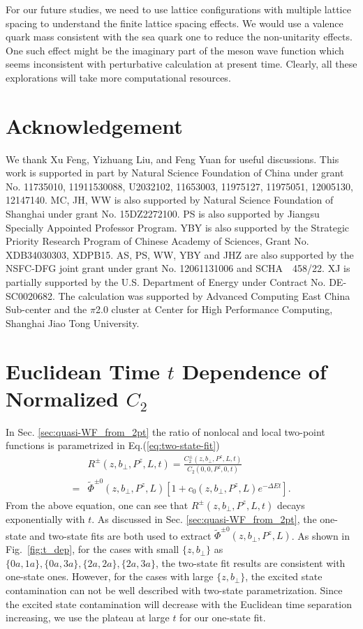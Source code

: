 \documentclass[prd,aps,twocolumn,preprintnumbers, showpacs, nofootinbib,superscriptaddress,notitlepage]{revtex4-1}
\begin{document}
For our future studies, we need to
use lattice configurations with multiple lattice spacing to understand the finite
lattice spacing effects. We would
use a valence quark mass consistent with the sea quark one to reduce the non-unitarity effects. One such effect 
might be the imaginary part of the meson
wave function which seems inconsistent
with perturbative calculation at present time. Clearly, all these explorations will
take more computational resources. 


\section*{Acknowledgement}
We thank Xu Feng, Yizhuang Liu, and Feng Yuan for useful discussions.  This work is supported in part by Natural Science Foundation of China under grant No. 11735010, 11911530088, U2032102, 11653003, 11975127, 11975051, 12005130, 12147140. MC, JH, WW is also supported  by Natural Science Foundation of Shanghai under grant No. 15DZ2272100.  PS is also supported by Jiangsu Specially Appointed Professor Program. YBY is also supported by the Strategic Priority Research Program of Chinese Academy of Sciences, Grant No. XDB34030303, XDPB15. AS, PS, WW, YBY and JHZ are also supported by the NSFC-DFG joint grant under grant No. 12061131006 and SCHA~~458/22. XJ is partially supported by the U.S. Department of Energy under Contract No. DE-SC0020682. The calculation was supported by Advanced Computing East China Sub-center and the $\pi$2.0 cluster at Center for High Performance Computing, Shanghai Jiao Tong University.

\appendix

\section{Euclidean Time $t$ Dependence of Normalized $C_2$}
\label{appsec:C2}


In Sec. \ref{sec:quasi-WF_from_2pt} the ratio of nonlocal and local  two-point functions is parametrized in Eq.(\ref{eq:two-state-fit})
\begin{align}
&R^{\pm}\left(z,b_{\perp},P^z,L,t \right)=\frac{C_2^{\pm}\left(z,b_{\perp},P^z,L,t \right)}{C_2\left(0,0,P^z,0,t \right)} \nonumber\\
=&\tilde{\Phi}^{\pm0}\left(z,b_{\perp},P^z,L\right)\left[1+c_0\left(z,b_{\perp},P^z,L\right)e^{-\Delta Et} \right].
\end{align}
From the above equation, one can see that $R^{\pm}\left(z,b_{\perp},P^z,L,t \right)$ decays exponentially with $t$. As discussed in Sec. \ref{sec:quasi-WF_from_2pt}, the one-state and two-state fits are both used to extract $\tilde{\Phi}^{\pm0}\left(z,b_{\perp},P^z,L\right)$. As shown in Fig.~\ref{fig:t_dep}, for the cases with small $\{z,b_\perp\}$  as $\{0a,1a\},\{0a,3a\},\{2a,2a\},\{2a,3a\}$, the two-state fit results are consistent with one-state ones. However, for the cases with large $\{z, b_\perp\}$, the excited state contamination can not be well described with two-state parametrization. Since the excited state contamination will decrease with the Euclidean time separation increasing, we use the plateau at large $t$ for our one-state fit.
\end{document}
